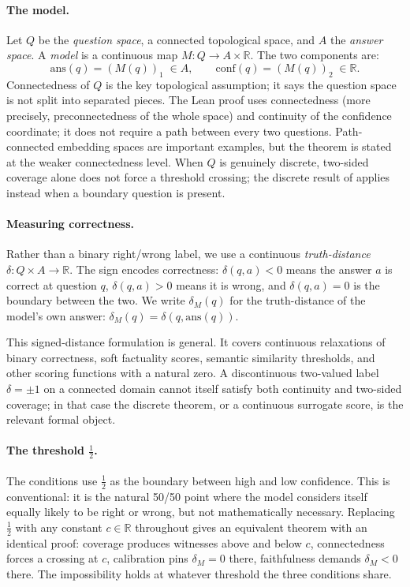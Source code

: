 \documentclass[10pt]{article}
\newcommand{\R}{\mathbb{R}}
\newcommand{\conf}{\mathrm{conf}}
\newcommand{\ans}{\mathrm{ans}}
\begin{document}
\paragraph{The model.}
Let $Q$ be the \emph{question space}, a connected topological space,
and $A$ the \emph{answer space}. A \emph{model} is a continuous map
$M\colon Q \to A \times \R$. The two components are:
\[
  \ans(q) = (M(q))_1 \;\in A, \qquad \conf(q) = (M(q))_2 \;\in \R.
\]
Connectedness of $Q$ is the key topological assumption; it says the
question space is not split into separated pieces. The Lean proof uses
connectedness (more precisely, preconnectedness of the whole space) and
continuity of the confidence coordinate; it does not require a path between
every two questions. Path-connected embedding spaces are important examples,
but the theorem is stated at the weaker connectedness level. When $Q$ is
genuinely discrete, two-sided coverage alone does not force a threshold
crossing; the discrete result of  applies instead when a
boundary question is present.

\paragraph{Measuring correctness.}
Rather than a binary right/wrong label, we use a continuous
\emph{truth-distance} $\delta\colon Q \times A \to \R$. The sign encodes
correctness: $\delta(q,a) < 0$ means the answer $a$ is correct at
question $q$, $\delta(q,a) > 0$ means it is wrong, and $\delta(q,a) = 0$
is the boundary between the two. We write $\delta_M(q)$ for the
truth-distance of the model's own answer: $\delta_M(q) = \delta(q, \ans(q))$.

This signed-distance formulation is general. It covers continuous
relaxations of binary correctness, soft factuality scores, semantic
similarity thresholds, and other scoring functions with a natural zero.
A discontinuous two-valued label $\delta=\pm1$ on a connected domain cannot
itself satisfy both continuity and two-sided coverage; in that case the
discrete theorem, or a continuous surrogate score, is the relevant formal
object.

\paragraph{The threshold $\tfrac{1}{2}$.}
The conditions use $\tfrac{1}{2}$ as the boundary between high and low
confidence. This is conventional: it is the natural 50/50 point where
the model considers itself equally likely to be right or wrong, but not
mathematically necessary. Replacing $\tfrac{1}{2}$ with any constant
$c \in \R$ throughout gives an equivalent theorem with an identical proof:
coverage produces witnesses above and below $c$, connectedness forces a
crossing at $c$, calibration pins $\delta_M = 0$ there, faithfulness
demands $\delta_M < 0$ there. The impossibility holds at whatever
threshold the three conditions share.
\end{document}
